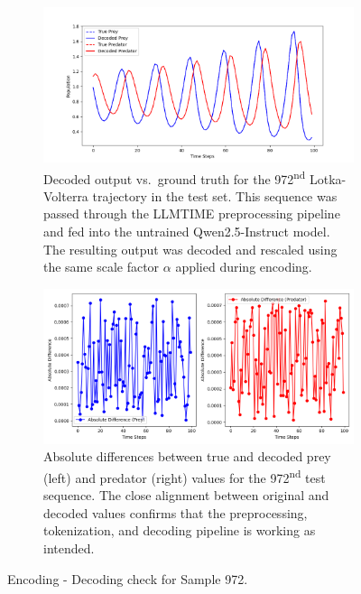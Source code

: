 \documentclass[a4paper,12pt]{article}
\begin{document}
\begin{figure}[H]
  \centering

  \begin{subfigure}[t]{0.95\textwidth}
      \centering
      \includegraphics[width=\textwidth]{true_vs_decoded.png}
      \caption{Decoded output vs.\ ground truth for the 972\textsuperscript{nd} Lotka-Volterra trajectory in the test set. This sequence was passed through the LLMTIME preprocessing pipeline and fed into the untrained Qwen2.5-Instruct model. The resulting output was decoded and rescaled using the same scale factor $\alpha$ applied during encoding.}
      \label{fig:true_vs_decoded}
  \end{subfigure}

  \vspace{0.5cm}

  \begin{subfigure}[t]{0.95\textwidth}
      \centering
      \includegraphics[width=\textwidth]{absolute_differences.png}
      \caption{Absolute differences between true and decoded prey (left) and predator (right) values for the 972\textsuperscript{nd} test sequence.  The close alignment between original and decoded values confirms that the preprocessing, tokenization, and decoding pipeline is working as intended.}
      \label{fig:absolute_differences}
  \end{subfigure}
  \vspace{0.5cm}
  \caption{ Encoding - Decoding check for Sample 972.}
  \label{fig:decoding_pipeline_evaluation}
\end{figure}
\end{document}
